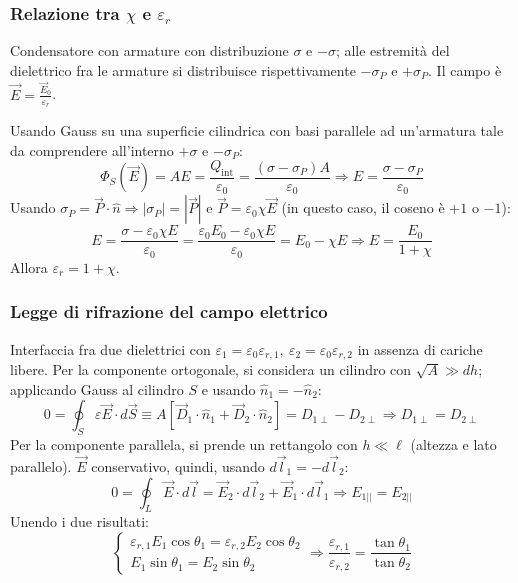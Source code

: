 \documentclass[a4paper]{scrartcl}
\numberwithin{equation}{subsection}
\theoremstyle{style1}
\begin{document}
\subsubsection{Relazione tra $\chi $ e $\varepsilon _r$}
Condensatore con armature con distribuzione $\sigma $ e $-\sigma $; alle estremit\`a del dielettrico fra le armature si distribuisce rispettivamente $-\sigma _P$ e $+ \sigma _P$. Il campo \`e $\vec{E} = \frac{\vec{E}_0}{\varepsilon _r}$.

Usando Gauss su una superficie cilindrica con basi parallele ad un'armatura tale da comprendere all'interno $+\sigma$ e $-\sigma _P$:
\begin{equation}
	\Phi_S(\vec{E}) = AE = \frac{Q_\text{int}}{\varepsilon _0} = \frac{(\sigma - \sigma _P)A}{\varepsilon _0} \Rightarrow E = \frac{\sigma -\sigma _P}{\varepsilon _0}
\end{equation}
Usando $\sigma _P = \vec{P}\cdot \hat{n}\Rightarrow \left\lvert \sigma _P \right\rvert = \left\lvert \vec{P} \right\rvert $ e $\vec{P} = \varepsilon _0 \chi \vec{E}$ (in questo caso, il coseno \`e $+1$ o $-1$):
\begin{equation}
	E = \frac{\sigma -\varepsilon _0 \chi E}{\varepsilon _0} = \frac{\varepsilon _0 E_0 - \varepsilon _0 \chi E}{\varepsilon _0}= E_0 - \chi E \Rightarrow E = \frac{E_0}{1+ \chi }
\end{equation}
Allora $\varepsilon _r = 1+\chi $.

\subsubsection{Legge di rifrazione del campo elettrico}
Interfaccia fra due dielettrici con $\varepsilon _1 = \varepsilon _0 \varepsilon _{r,1}, \ \varepsilon _2 = \varepsilon _0 \varepsilon _{r,2}  $ in assenza di cariche libere. Per la componente ortogonale, si considera un cilindro con $\sqrt{A} \gg dh$; applicando Gauss al cilindro $S$ e usando $\hat{n}_1 = - \hat{n}_2$:
\begin{equation}
	0=\oint_{S} \varepsilon \vec{E}\cdot d\vec{S} \equiv A\left[ \vec{D}_1 \cdot \hat{n}_1 + \vec{D}_2 \cdot \hat{n}_2 \right] = D_{1\perp} - D_{2 \perp} \Rightarrow D_{1\perp}  = D_{2\perp} 
\end{equation}
Per la componente parallela, si prende un rettangolo con $h\ll \ell $ (altezza e lato parallelo). $\vec{E}$ conservativo, quindi, usando $d\vec{l}_1 = -d\vec{l}_2$:
\begin{equation}
	0=\oint_{L} \vec{E}\cdot d\vec{l} = \vec{E}_2 \cdot d\vec{l}_2 + \vec{E}_1 \cdot d\vec{l}_1 \Rightarrow E_{1 | |} = E_{2 | |}  
\end{equation}
Unendo i due risultati:
\begin{equation}
	\begin{cases}
		 \varepsilon _{r,1}  E_{1}\cos\theta _1  = \varepsilon _{r,2} E_{2}\cos\theta _2 \\
		 E_1 \sin \theta _1 =  E_2\sin \theta _2 
	\end{cases} \Rightarrow \frac{\varepsilon _{r,1} }{\varepsilon _{r,2} } = \frac{\tan \theta _1}{\tan\theta _2}
\end{equation}
\end{document}
